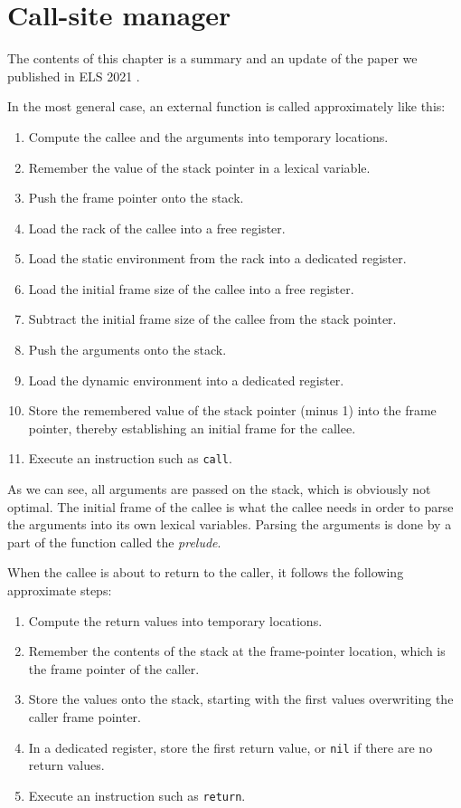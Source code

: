 \chapter{Call-site manager}
\label{chap-call-site-manager}

The contents of this chapter is a summary and an update of the paper
we published in ELS 2021 \cite{DBLP:conf/els/Strandh21}.

In the most general case, an external function is called approximately
like this:
\begin{enumerate}
\item Compute the callee and the arguments into temporary locations.
\item Remember the value of the stack pointer in a lexical variable.
\item Push the frame pointer onto the stack.
\item Load the rack of the callee into a free register.
\item Load the static environment from the rack into a dedicated
  register.
\item Load the initial frame size of the callee into a free register.
\item Subtract the initial frame size of the callee from the stack
  pointer.
\item Push the arguments onto the stack.
\item Load the dynamic environment into a dedicated register.
\item Store the remembered value of the stack pointer (minus 1) into
  the frame pointer, thereby establishing an initial frame for the
  callee.
\item Execute an instruction such as \texttt{call}.
\end{enumerate}

As we can see, all arguments are passed on the stack, which is
obviously not optimal.  The initial frame of the callee is what the
callee needs in order to parse the arguments into its own lexical
variables.  Parsing the arguments is done by a part of the function
called the \emph{prelude}.

When the callee is about to return to the caller, it follows the
following approximate steps:

\begin{enumerate}
\item Compute the return values into temporary locations.
\item Remember the contents of the stack at the frame-pointer
  location, which is the frame pointer of the caller.
\item Store the values onto the stack, starting with the first values
  overwriting the caller frame pointer.
\item In a dedicated register, store the first return value, or
  \texttt{nil} if there are no return values.
\item Execute an instruction such as \texttt{return}.
\end{enumerate}


